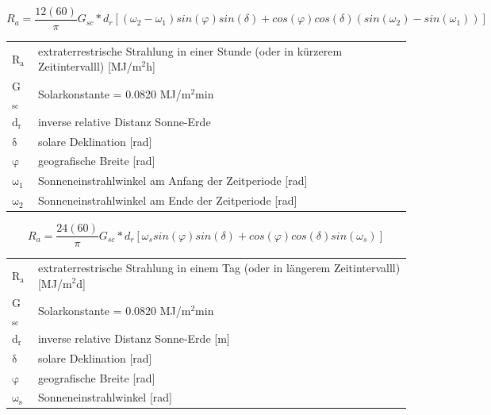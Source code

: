 \begin{appendix}
\begin{description}
\begin{equation}
\label{eq:Ra_short_period}
R_{a}=\frac{12 (60)}{\pi}G_{sc}*d_{r}[(\omega _{2}-\omega _{1})sin(\varphi)sin(\delta)+cos(\varphi)cos(\delta)(sin(\omega _{2})- sin(\omega _{1}))]
\end{equation}
\begin{table}[H]
\centering
\begin{tabular}{ll}
R$\mathrm{_{a}}$ & extraterrestrische Strahlung in einer Stunde (oder in kürzerem Zeitintervalll) [MJ/m$\mathrm{^{2}}$h]\\
G$\mathrm{_{sc}}$ & Solarkonstante = 0.0820 MJ/m$\mathrm{^{2}}$min\\
d$\mathrm{_{r}}$ & inverse relative Distanz Sonne-Erde\\
$\mathrm{\delta}$ & solare Deklination [rad]\\
$\mathrm{\varphi}$ & geografische Breite [rad]\\
$\mathrm{\omega_{1}}$ & Sonneneinstrahlwinkel am Anfang der Zeitperiode [rad]\\
$\mathrm{\omega_{2}}$ & Sonneneinstrahlwinkel am Ende der Zeitperiode [rad]\\
\end{tabular}
\end{table}

\begin{equation}
\label{eq:Ra_long_period}
R_{a}=\frac{24 (60)}{\pi}G_{sc}*d_{r}[\omega _{s}sin(\varphi)sin(\delta)+cos(\varphi)cos(\delta)sin(\omega _{s})]
\end{equation}
\begin{table}[H]
\centering
\begin{tabular}{ll}
R$\mathrm{_{a}}$ & extraterrestrische Strahlung in einem Tag (oder in längerem Zeitintervalll) [MJ/m$\mathrm{^{2}}$d]\\
G$\mathrm{_{sc}}$ & Solarkonstante = 0.0820 MJ/m$\mathrm{^{2}}$min\\
d$\mathrm{_{r}}$ & inverse relative Distanz Sonne-Erde [m]\\
$\mathrm{\delta}$ & solare Deklination [rad]\\
$\mathrm{\varphi}$ & geografische Breite [rad]\\
$\mathrm{\omega_{s}}$ & Sonneneinstrahlwinkel [rad]\\
\end{tabular}
\end{table}


\end{description}
\end{appendix}
